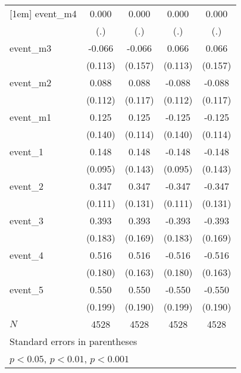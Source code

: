 {\begin{tabular}{l*{4}{c}}
[1em]
event\_m4    &       0.000         &       0.000         &       0.000         &       0.000         \\
            &         (.)         &         (.)         &         (.)         &         (.)         \\
[1em]
event\_m3    &      -0.066         &      -0.066         &       0.066         &       0.066         \\
            &     (0.113)         &     (0.157)         &     (0.113)         &     (0.157)         \\
[1em]
event\_m2    &       0.088         &       0.088         &      -0.088         &      -0.088         \\
            &     (0.112)         &     (0.117)         &     (0.112)         &     (0.117)         \\
[1em]
event\_m1    &       0.125         &       0.125         &      -0.125         &      -0.125         \\
            &     (0.140)         &     (0.114)         &     (0.140)         &     (0.114)         \\
[1em]
event\_1     &       0.148         &       0.148         &      -0.148         &      -0.148         \\
            &     (0.095)         &     (0.143)         &     (0.095)         &     (0.143)         \\
[1em]
event\_2     &       0.347\sym{**} &       0.347\sym{**} &      -0.347\sym{**} &      -0.347\sym{**} \\
            &     (0.111)         &     (0.131)         &     (0.111)         &     (0.131)         \\
[1em]
event\_3     &       0.393\sym{*}  &       0.393\sym{*}  &      -0.393\sym{*}  &      -0.393\sym{*}  \\
            &     (0.183)         &     (0.169)         &     (0.183)         &     (0.169)         \\
[1em]
event\_4     &       0.516\sym{**} &       0.516\sym{**} &      -0.516\sym{**} &      -0.516\sym{**} \\
            &     (0.180)         &     (0.163)         &     (0.180)         &     (0.163)         \\
[1em]
event\_5     &       0.550\sym{**} &       0.550\sym{**} &      -0.550\sym{**} &      -0.550\sym{**} \\
            &     (0.199)         &     (0.190)         &     (0.199)         &     (0.190)         \\
\hline
\(N\)       &        4528         &        4528         &        4528         &        4528         \\
\hline\hline
\multicolumn{5}{l}{\footnotesize Standard errors in parentheses}\\
\multicolumn{5}{l}{\footnotesize \sym{*} \(p<0.05\), \sym{**} \(p<0.01\), \sym{***} \(p<0.001\)}\\
\end{tabular}
}
